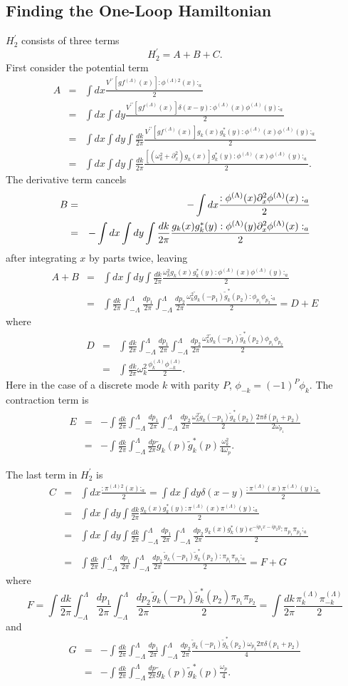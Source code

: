 \def\letter{0}\def\pr{0}\documentclass[a4paper,12pt, epsfig]{article}
\renewcommand{\(}{\begin{equation}}
\renewcommand{\)}{end{equation} \vspace{-.05in}\linebreak}
\renewcommand{\=}{\hspace{-.03in}=\hspace{-.02in}}
\renewcommand{\(}{\begin{equation}}
\renewcommand{\)}{\end{equation}}
\newcommand{\p}{^\prime}
\newcommand{\pp}{^{\prime\prime}}
\renewcommand{\(}{\begin{equation}}
\renewcommand{\)}{\end{equation}}
\def\lpin#1{\int^\Lambda_{-\Lambda} \frac{d#1}{2\pi}}
\def\pin#1{\int \frac{d#1}{2\pi}}
\renewcommand{\L}{{(\Lambda)}}
\newcommand{\beq}{\begin{equation}}
\newcommand{\eeq}{\end{equation}}
\newcommand{\bea}{\begin{eqnarray}}
\newcommand{\eea}{\end{eqnarray}}
\begin{document}
\subsection{Finding the One-Loop Hamiltonian}

$H\p_2$ consists of three terms
\beq
H\p_2=A+B+C.
\eeq
First consider the potential term
\bea
A&=&\int dx \frac{V\pp[g f^\L(x)]:\phi^{\L 2}(x):_a}{2}\\
&=&\int dx\int dy \frac{V\pp[g f^\L(x)]\delta(x-y):\phi^{\L}(x)\phi^\L(y):_a}{2}\nonumber\\
&=&\int dx\int dy\pin{k} \frac{V\pp[g f^\L(x)]g_k(x)g^*_k(y):\phi^{\L}(x)\phi^\L(y):_a}{2}\nonumber\\
&=&\int dx\int dy\pin{k} \frac{\left[(\omega_{k}^2+\partial_x^2)g_k(x)\right]g^*_k(y):\phi^{\L}(x)\phi^\L(y):_a}{2}.\nonumber
\eea
The derivative term cancels
\bea
B&=&-\int dx \frac{:{\phi}^\L (x)\partial^2_x {\phi}^\L (x):_a}{2}\\\notag
&=&-\int dx\int dy \pin{k} \frac{g_k(x)g^*_{k}(y):{\phi}^\L (y)\partial^2_x {\phi}^\L (x):_a}{2}\nonumber
\eea
after integrating $x$ by parts twice, leaving
\bea
A+B&=&\int dx\int dy\pin{k} \frac{\omega_{k}^2 g_k(x)g^*_k(y):\phi^{\L}(x)\phi^\L(y):_a}{2}\\
&=&\pin{k}\lpin{p_1}\lpin{p_2} \frac{\omega_{k}^2 \tilde{g}_k(-p_1)\tilde{g}^*_k(p_2):\phi_{p_1}\phi_{p_2}:_a}{2}=D+E\nonumber
\eea
where
\bea
D&=&\pin{k}\lpin{p_1}\lpin{p_2} \frac{\omega_{k}^2 \tilde{g}_k(-p_1)\tilde{g}^*_k(p_2)\phi_{p_1}\phi_{p_2}}{2}\label{deq}\\
&=&\pin{k}\omega_k^2\frac{\phi^\L_{k}\phi^\L_{-k}}{2}.\nonumber
\eea
Here in the case of a discrete mode $k$ with parity $P$, $\phi_{-k}=(-1)^P\phi_k$.  The contraction term is
\bea
E&=&-\pin{k}\lpin{p_1}\lpin{p_2} \frac{\omega_{k}^2 \tilde{g}_k(-p_1)\tilde{g}^*_k(p_2)}{2}\frac{2\pi\delta(p_1+p_2)}{2\omega_{p_1}}\\
&=&-\pin{k}\lpin{p}\tilde{g}_k(p)\tilde{g}^*_k(p) \frac{\omega_{k}^2 }{4\omega_p}.\nonumber
\eea

The last term in $H\p_2$ is
\bea
C&=&\int dx \frac{:\pi^{\L 2}(x):_a}{2}
=\int dx\int dy \delta(x-y) \frac{:\pi^{\L}(x)\pi^\L(y):_a}{2}\\
&=&\int dx\int dy\pin{k}\frac{g_k(x)g^*_k(y):\pi^{\L}(x)\pi^\L(y):_a}{2}\nonumber\\
&=&\int dx\int dy\pin{k}\lpin{p_1}\lpin{p_2}
\frac{g_k(x)g^*_k(y)e^{-ip_1x-ip_2y}:\pi_{p_1}\pi_{p_2}:_a}{2}\nonumber\\
&=&\pin{k}\lpin{p_1}\lpin{p_2}
\frac{\tilde{g}_k(-p_1)\tilde{g}^*_k(p_2):\pi_{p_1}\pi_{p_2}:_a}{2}=F+G\nonumber
\eea
where
\beq
F=\pin{k}\lpin{p_1}\lpin{p_2}
\frac{\tilde{g}_k(-p_1)\tilde{g}^*_k(p_2)\pi_{p_1}\pi_{p_2}}{2}=\pin{k}\frac{\pi^\L_{k}\pi^\L_{-k}}{2} \label{feq}
\eeq
and
\bea
G&=&-\pin{k}\lpin{p_1}\lpin{p_2}
\frac{\tilde{g}_k(-p_1)\tilde{g}^*_k(p_2)\omega_{p_2}2\pi\delta(p_1+p_2)}{4}\nonumber\\
&=&-\pin{k}\lpin{p} \tilde{g}_k(p)\tilde{g}^*_k(p) \frac{\omega_{p}}{4}.
\eea
\end{document}
